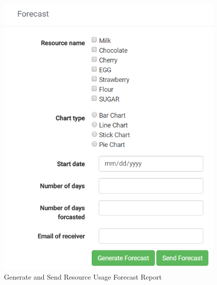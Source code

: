 \documentclass[a4paper,11pt,twoside]{report}
\theoremstyle{definition}
\begin{document}
\begin{enumerate}
\begin{figure}[h!]
\begin{center}
\includegraphics[scale = 1]{AS/report/4}
\end{center}
\caption{Generate and Send Resource Usage Forecast Report}
\end{figure}
\thispagestyle{empty}


\end{enumerate}
\end{document}
